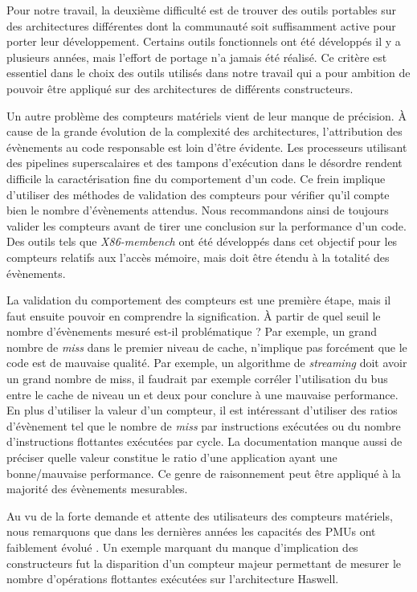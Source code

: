                 Pour notre travail, la deuxième difficulté est de trouver des outils portables sur des architectures différentes dont la communauté soit suffisamment active pour porter leur développement. Certains outils fonctionnels ont été développés il y a plusieurs années, mais l'effort de portage n'a jamais été réalisé. Ce critère est essentiel dans le choix des outils utilisés dans notre travail qui a pour ambition de pouvoir être appliqué sur des architectures de différents constructeurs.
            
                Un autre problème des compteurs matériels vient de leur manque de précision. À cause de la grande évolution de la complexité des architectures, l'attribution des évènements au code responsable est loin d'être évidente. Les processeurs utilisant des pipelines superscalaires et des tampons d'exécution dans le désordre rendent difficile la caractérisation fine du comportement d'un code. Ce frein implique d'utiliser des méthodes de validation des compteurs pour vérifier qu'il compte bien le nombre d'évènements attendus. Nous recommandons ainsi de toujours valider les compteurs avant de tirer une conclusion sur la performance d'un code. Des outils tels que \textit{X86-membench}\cite{Molka2017} ont été développés dans cet objectif pour les compteurs relatifs aux l’accès mémoire, mais doit être étendu à la totalité des évènements.
            
            La validation du comportement des compteurs est une première étape, mais il faut ensuite pouvoir en comprendre la signification. À partir de quel seuil le nombre d'évènements mesuré est-il problématique ? Par exemple, un grand nombre de \textit{miss} dans le premier niveau de cache, n'implique pas forcément que le code est de mauvaise qualité. Par exemple, un algorithme de \textit{streaming} doit avoir un grand nombre de miss, il faudrait par exemple corréler l'utilisation du bus entre le cache de niveau un et deux pour conclure à une mauvaise performance. En plus d'utiliser la valeur d'un compteur, il est intéressant d'utiliser des ratios d'évènement tel que le nombre de \textit{miss} par instructions exécutées ou du nombre d'instructions flottantes exécutées par cycle. La documentation manque aussi de préciser quelle valeur constitue le ratio d'une application ayant une bonne/mauvaise performance. Ce genre de raisonnement peut être appliqué à la majorité des évènements mesurables. 
            
            
            Au vu de la forte demande et attente des utilisateurs des compteurs matériels, nous remarquons que dans les dernières années les capacités des PMUs ont faiblement évolué \cite{Intel2017}. Un exemple marquant du manque d'implication des constructeurs fut la disparition d'un compteur majeur permettant de mesurer le nombre d'opérations flottantes exécutées sur l'architecture Haswell.

       